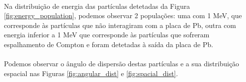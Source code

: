 \documentclass[a4paper, 12pt]{article} %
\begin{document}
	\paragraph{} Na distribuição de energia das partículas detetadas da Figura \ref{fig:energy_population}, podemos observar 2 populações: uma com 1 MeV, que corresponde às partículas que não interagiram com a placa de Pb, outra com energia inferior a 1 MeV que corresponde às partículas que sofreram espalhamento de Compton e foram detetadas à saída da placa de Pb.

	\paragraph{} Podemos observar o ângulo de dispersão destas partículas e a sua distribuição espacial nas Figuras \ref{fig:angular_dist} e \ref{fig:spacial_dist}.
\end{document}
